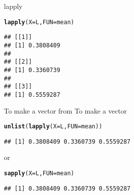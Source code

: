 \documentclass[aspectratio=169]{beamer}\usepackage[]{graphicx}\usepackage[]{xcolor}
\makeatletter
\newcommand{\hldef}[1]{\textcolor[rgb]{0.345,0.345,0.345}{#1}}%
\newcommand{\hlkwc}[1]{\textcolor[rgb]{0.333,0.667,0.333}{#1}}%
\newcommand{\hlkwd}[1]{\textcolor[rgb]{0.737,0.353,0.396}{\textbf{#1}}}%
\newenvironment{kframe}{%
 \def\at@end@of@kframe{}%
 \ifinner\ifhmode%
  \def\at@end@of@kframe{\end{minipage}}%
  \begin{minipage}{\columnwidth}%
 \fi\fi%
 \def\FrameCommand##1{\hskip\@totalleftmargin \hskip-\fboxsep
 \colorbox{shadecolor}{##1}\hskip-\fboxsep
     \hskip-\linewidth \hskip-\@totalleftmargin \hskip\columnwidth}%
 \MakeFramed {\advance\hsize-\width
   \@totalleftmargin\z@ \linewidth\hsize
   \@setminipage}}%
 {\par\unskip\endMakeFramed%
 \at@end@of@kframe}
\newenvironment{knitrout}{}{} %
\makeatother
\begin{document}
\begin{frame}[fragile]{lapply}
\begin{knitrout}
\color{fgcolor}\begin{kframe}
\begin{alltt}
\hlkwd{lapply}\hldef{(}\hlkwc{X} \hldef{= L,} \hlkwc{FUN} \hldef{= mean)}
\end{alltt}
\begin{verbatim}
## [[1]]
## [1] 0.3808409
## 
## [[2]]
## [1] 0.3360739
## 
## [[3]]
## [1] 0.5559287
\end{verbatim}
\end{kframe}
\end{knitrout}
\end{frame}

\begin{frame}[fragile]{To make a vector from }
To make a vector
\begin{knitrout}
\color{fgcolor}\begin{kframe}
\begin{alltt}
\hlkwd{unlist}\hldef{(}\hlkwd{lapply}\hldef{(}\hlkwc{X} \hldef{= L,} \hlkwc{FUN} \hldef{= mean))}
\end{alltt}
\begin{verbatim}
## [1] 0.3808409 0.3360739 0.5559287
\end{verbatim}
\end{kframe}
\end{knitrout}
or
\begin{knitrout}
\color{fgcolor}\begin{kframe}
\begin{alltt}
\hlkwd{sapply}\hldef{(}\hlkwc{X} \hldef{= L,} \hlkwc{FUN} \hldef{= mean)}
\end{alltt}
\begin{verbatim}
## [1] 0.3808409 0.3360739 0.5559287
\end{verbatim}
\end{kframe}
\end{knitrout}
\end{frame} 
\end{document}
